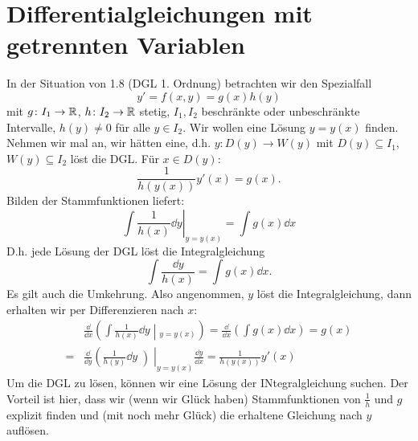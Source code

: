 \chapter{Differentialgleichungen mit getrennten Variablen}
In der Situation von 1.8 (DGL 1. Ordnung) betrachten wir den Spezialfall
\[ y'=f(x,y)=g(x)h(y) \]
mit $ g\colon I_1\rightarrow\mathbb{R} $, $ h\colon I_2\rightarrow\mathbb{R} $ stetig, $ I_1,I_2 $ beschr\"ankte oder unbeschr\"ankte Intervalle, $ h(y)\neq 0 $ f\"ur alle $ y\in I_2 $. Wir wollen eine L\"osung $ y=y(x) $ finden. Nehmen wir mal an, wir h\"atten eine, d.h. $ y\colon D(y)\rightarrow W(y) $ mit $ D(y)\subseteq I_1 $, $ W(y)\subseteq I_2 $ l\"ost die DGL. F\"ur $ x\in D(y): $
\[ \frac{1}{h(y(x))}y'(x)=g(x). \]
Bilden der Stammfunktionen liefert:
\[ \left.\int\frac{1}{h(x)}\dd y\right|_{y=y(x)}=\int g(x)\dd x \]
D.h. jede L\"osung der DGL l\"ost die Integralgleichung
\[ \int\frac{\dd y}{h(x)}=\int g(x)\dd x. \]
Es gilt auch die Umkehrung. Also angenommen, $ y $ l\"ost die Integralgleichung, dann erhalten wir per Differenzieren nach $ x $:
\begin{align*} &\frac{\dd}{\dd x}\left(\int\frac{1}{h(x)}\dd y\middle|_{y=y(x)}\right)=\frac{\dd}{\dd x}\left(\int g(x)\dd x\right)=g(x)\\=&\frac{\dd}{\dd y}\left(\frac{1}{h(y)}\dd y\middle)\right|_{y=y(x)}\frac{\dd y}{\dd x}=\frac{1}{h(y(x))}y'(x) \end{align*}
Um die DGL zu l\"osen, k\"onnen wir eine L\"osung der INtegralgleichung suchen. Der Vorteil ist hier, dass wir (wenn wir Gl\"uck haben) Stammfunktionen von $ \frac{1}{h} $ und $ g $ explizit finden und (mit noch mehr Gl\"uck) die erhaltene Gleichung nach $ y $ aufl\"osen.
